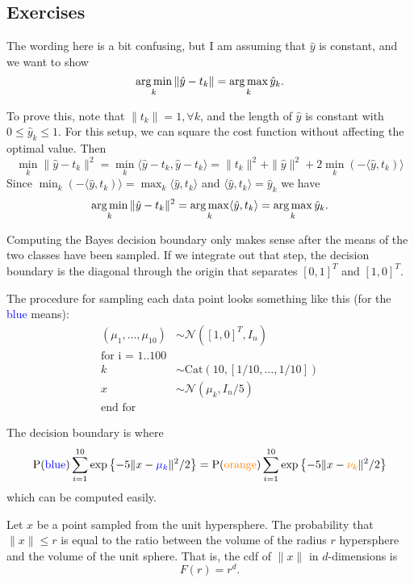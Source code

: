 \subsection*{Exercises}

The wording here is a bit confusing, but I am assuming that $\hat{y}$ is constant, and we want to show 
$$
\operatorname*{arg\,min}_k \|\hat{y} - t_k\| = \operatorname*{arg\,max}_k \hat{y}_k.
$$

To prove this, note that $\|t_k\| = 1, \forall k$, and the length of $\hat{y}$ is constant with $0 \leq \hat{y}_k \leq 1$. For this setup, we can square the cost function without affecting the optimal value. Then
$$
\min_k \|\hat{y} - t_k\|^2 = \min_k \langle \hat{y} - t_k, \hat{y} - t_k \rangle = \|t_k\|^2 + \|\hat{y}\|^2 + 2\min_k (-\langle \hat{y}, t_k) \rangle
$$
Since $\min_k (-\langle \hat{y}, t_k)\rangle = \max_k \langle \hat{y}, t_k\rangle$ and $\langle \hat{y}, t_k\rangle = \hat{y}_k$ we have
$$
\operatorname*{arg\,min}_k \|\hat{y} - t_k\|^2 =\operatorname*{arg\,max}_k \langle \hat{y}, t_k \rangle = \operatorname*{arg\,max}_k \hat{y}_k.
$$

Computing the Bayes decision boundary only makes sense after the means of the two classes have been sampled. If we integrate out that step, the decision boundary is the diagonal through the origin that separates $[0, 1]^T$ and $[1, 0]^T$.

The procedure for sampling each data point looks something like this (for the \textcolor{blue}{blue} means):
\begin{align*}
(\mu_1, \ldots, \mu_{10}) &\sim \mathcal{N}([1, 0]^T, I_n)\\
\text{for i = 1..100}\\
k &\sim \mathrm{Cat}(10, [1/10, \ldots, 1/10])\\
x &\sim \mathcal{N}(\mu_k, I_n / 5)\\
\text{end for}
\end{align*}

The decision boundary is where
$$
\mathrm{P}(\textcolor{blue}{\mathrm{blue}}) \sum_{i = 1}^{10} \exp\left\{-5\|x - \textcolor{blue}{\mu_k}\|^2 / 2\right\} = \mathrm{P}(\textcolor{orange}{\mathrm{orange}}) \sum_{i = 1}^{10} \exp\left\{-5\|x - \textcolor{orange}{\nu_k}\|^2 / 2\right\} 
$$
which can be computed easily.

Let $x$ be a point sampled from the unit hypersphere. The probability that $\|x\| \leq r$ is equal to the ratio between the volume of the radius $r$ hypersphere and the volume of the unit sphere. That is, the cdf of $\|x\|$ in $d$-dimensions is
$$
F(r) = r^d.
$$

